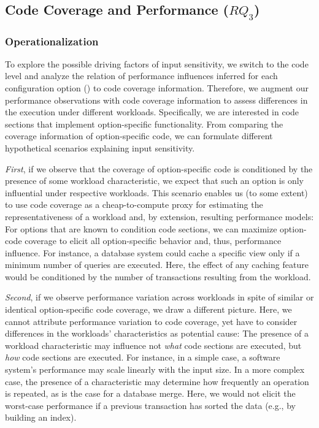 {{{\subsection{Code Coverage and Performance ($RQ_3$)}\label{sec:rq3}\label{sec:categories}
\subsubsection{Operationalization}To explore the possible driving factors of input sensitivity, we switch to the code level and analyze the relation of performance influences inferred for each configuration option () to code coverage information. Therefore, we augment our performance observations with code coverage information to assess differences in the execution under different workloads. Specifically, we are interested in code sections that implement option-specific functionality. From comparing the coverage information of option-specific code, we can formulate different hypothetical scenarios explaining input sensitivity. 

\textit{First}, if we observe that the  coverage of option-specific code is conditioned by the presence of some workload characteristic, we expect that such an option is only influential under respective workloads. This scenario enables us (to some extent) to use code coverage as a cheap-to-compute proxy for estimating the representativeness of a workload and, by extension, resulting performance models: For options that are known to condition code sections, we can maximize option-code coverage to elicit all option-specific behavior and, thus, performance influence. For instance, a database system could cache a specific view only if a minimum number of queries are executed. Here, the effect of any caching feature would be conditioned by the number of transactions resulting from the workload.

\textit{Second}, if we observe performance variation across workloads in spite of similar or identical option-specific code coverage, we draw a different picture. Here, we cannot attribute performance variation to code coverage, yet have to consider differences in the workloads’ characteristics as potential cause: The presence of a workload characteristic may influence not  \emph{what} code sections are executed, but \emph{how} code sections are executed. For instance, in a simple case, a software system’s performance may scale linearly with the input size. In a more complex case, the presence of a characteristic may determine how frequently an operation is repeated, as is the case for a database merge. Here, we would not elicit the worst-case performance if a previous transaction has sorted the data (e.g., by building an index).

}}}
